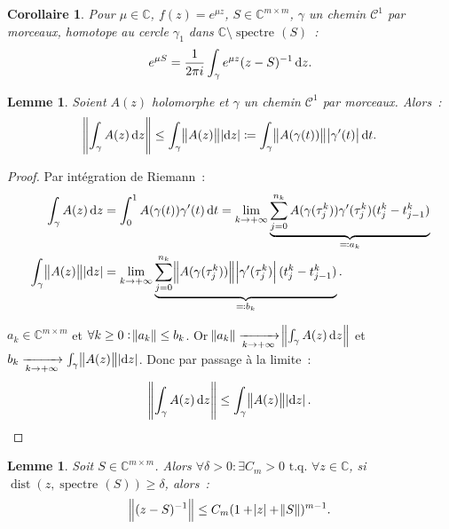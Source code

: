 \documentclass{report}
\DeclareMathOperator{\spectreOperator}{spectre\!}
\DeclareMathOperator{\dist}{dist}
\newcommand{\C}{{\mathbb C}}
\newcommand{\tq}{\text{ t.q. }}
\newcommand{\st}{\tq}
\newcommand{\pinfty}{{+\infty}}
\newcommand{\spectre}[1]{{\spectreOperator\left(#1\right)}}
\newtheorem{cor}[thm]{Corollaire}
\newtheorem{lem}[thm]{Lemme}
\theoremstyle{definition}
\theoremstyle{remark}
\begin{document}
\begin{cor}\label{cor:Cauchy e^(mu S)} Pour $\mu \in \C$, $f(z) = e^{\mu z}$, $S \in \C^{m \times m}$, $\gamma$ un chemin $\mathcal C^1$ par morceaux, homotope au cercle $\gamma_1$ dans $\C \setminus \spectre S$~:
\[e^{\mu S} = \frac 1{2\pi i}\int_\gamma e^{\mu z}(z-S)^{-1}\dif z.\]
\end{cor}

\begin{lem} Soient $A(z)$ holomorphe et $\gamma$ un chemin $\mathcal C^1$ par morceaux. Alors~:
\[\norm {\int_\gamma A(z)\dif z} \leq \int_\gamma\norm {A(z)}\abs {\dif z} \coloneqq \int_\gamma \norm {A(\gamma(t))}\abs {\gamma'(t)}\dif t.\]
\end{lem}

\begin{proof} Par intégration de Riemann~:
\begin{align*}
	\int_\gamma A(z)\dif z &= \int_0^1 A(\gamma(t))\gamma'(t)\dif t
		= \lim_{k \to \pinfty}\underbrace {\sum_{j=0}^{n_k}A(\gamma(\tau_j^k))\gamma'(\tau_j^k)(t_j^k - t_{j-1}^k)}_{\eqqcolon a_k} \\
	\int_\gamma\norm {A(z)}\abs {\dif z} &= \lim_{k \to \pinfty}\underbrace {\sum_{j=0}^{n_k}\norm {A(\gamma(\tau_j^k))}\abs {\gamma'(\tau_j^k)}(t^k_j-t^k_{j-1})}_{\eqqcolon b_k}.
\end{align*}

$a_k \in \C^{m \times m}$ et $\forall k \geq 0 : \norm {a_k} \leq b_k$. Or $\norm {a_k} \xrightarrow[k \to \pinfty]{} \norm {\int_\gamma A(z)\dif z}$ et
$b_k \xrightarrow[k \to \pinfty]{} \int_\gamma \norm {A(z)}\abs {\dif z}$. Donc par passage à la limite~:
\[\norm {\int_\gamma A(z)\dif z} \leq \int_\gamma\norm {A(z)}\abs {\dif z}.\]
\end{proof}

\begin{lem}\label{lem:majoration inverse (z-S)} Soit $S \in \C^{m \times m}$. Alors $\forall \delta > 0 : \exists C_m > 0 \st \forall z \in \C$, si $\dist(z, \spectre S) \geq \delta$,
alors~:
\[\norm {(z-S)^{-1}} \leq C_m(1 + \abs z + \norm S)^{m-1}.\]
\end{lem}
\end{document}
